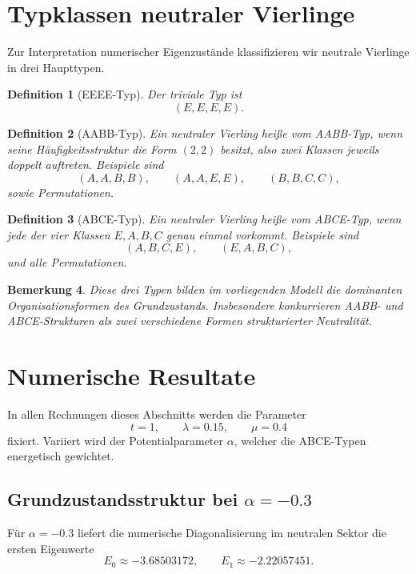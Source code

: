 \documentclass[11pt,a4paper]{article}
\newtheorem{definition}{Definition}[section]
\newtheorem{remark}[definition]{Bemerkung}
\begin{document}
	\section{Typklassen neutraler Vierlinge}
	
	Zur Interpretation numerischer Eigenzustände klassifizieren wir neutrale Vierlinge in drei Haupttypen.
	
	\begin{definition}[EEEE-Typ]
		Der triviale Typ ist
		\[
		(E,E,E,E).
		\]
	\end{definition}
	
	\begin{definition}[AABB-Typ]
		Ein neutraler Vierling heiße vom AABB-Typ, wenn seine Häufigkeitsstruktur die Form \((2,2)\) besitzt, also zwei Klassen jeweils doppelt auftreten. Beispiele sind
		\[
		(A,A,B,B),\qquad (A,A,E,E),\qquad (B,B,C,C),
		\]
		sowie Permutationen.
	\end{definition}
	
	\begin{definition}[ABCE-Typ]
		Ein neutraler Vierling heiße vom ABCE-Typ, wenn jede der vier Klassen \(E,A,B,C\) genau einmal vorkommt. Beispiele sind
		\[
		(A,B,C,E),\qquad (E,A,B,C),
		\]
		und alle Permutationen.
	\end{definition}
	
	\begin{remark}
		Diese drei Typen bilden im vorliegenden Modell die dominanten Organisationsformen des Grundzustands. Insbesondere konkurrieren AABB- und ABCE-Strukturen als zwei verschiedene Formen strukturierter Neutralität.
	\end{remark}
	
	\section{Numerische Resultate}
	
	In allen Rechnungen dieses Abschnitts werden die Parameter
	\[
	t=1,\qquad \lambda=0.15,\qquad \mu=0.4
	\]
	fixiert. Variiert wird der Potentialparameter \(\alpha\), welcher die ABCE-Typen energetisch gewichtet.
	
	\subsection{Grundzustandsstruktur bei \texorpdfstring{$\alpha=-0.3$}{alpha=-0.3}}
	
	Für \(\alpha=-0.3\) liefert die numerische Diagonalisierung im neutralen Sektor die ersten Eigenwerte
	\[
	E_0\approx -3.68503172,\qquad E_1\approx -2.22057451.
	\]
	
\end{document}
